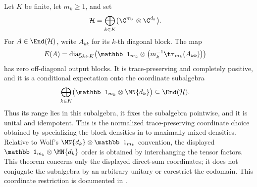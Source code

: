 \begin{theorem}
    \label{thm:coordinate_direct_sum_conditional_expectation}
    \leanok
    Let $K$ be finite, let $m_k\geq1$, and set
    \begin{align}
        \mathcal H
        &=\bigoplus_{k\in K}\bigl(\C^{m_k}\otimes\C^{d_k}\bigr).
        \notag
    \end{align}
    For $A\in\End(\mathcal H)$, write $A_{kk}$ for its $k$-th diagonal
    block. The map
    \begin{align}
        E(A)
        &=\operatorname{diag}_{k\in K}\!\left(
          \mathbb1_{m_k}\otimes
          \bigl(m_k^{-1}\tr_{m_k}(A_{kk})\bigr)\right)
        \notag
    \end{align}
    has zero off-diagonal output blocks. It is trace-preserving and completely
    positive, and it is a conditional expectation onto the coordinate
    subalgebra
    \begin{align}
        \bigoplus_{k\in K}
          \bigl(\mathbb1_{m_k}\otimes\MN{d_k}\bigr)
        &\subseteq\End(\mathcal H).
        \notag
    \end{align}
    Thus its range lies in this subalgebra, it fixes the subalgebra pointwise,
    and it is unital and idempotent. This is the normalized trace-preserving
    coordinate choice obtained by
    specializing the block densities in
    \cite[Proposition~1.5 and Equation~(1.40)]{Wolf2012Quantum} to maximally
    mixed densities. Relative to
    Wolf's $\MN{d_k}\otimes\mathbb1_{m_k}$ convention, the displayed
    $\mathbb1_{m_k}\otimes\MN{d_k}$ order is obtained by interchanging the
    tensor factors. This theorem concerns only the displayed direct-sum
    coordinates; it does not conjugate the subalgebra by an arbitrary unitary
    or corestrict the codomain. This coordinate restriction is documented in
    \cite{gap:wolf_prop1_5_one_factor_scope}.
\end{theorem}

